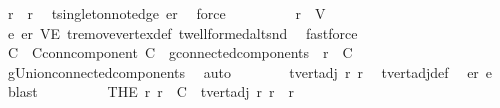 \begin{isabellebody}
\ {\isachardoublequoteopen}r{\isacharprime}{\kern0pt}\ {\isasymnoteq}\ r{\isachardoublequoteclose}\ \isamarkupfalse%
\ t{\isachardot}{\kern0pt}singleton{\isacharunderscore}{\kern0pt}not{\isacharunderscore}{\kern0pt}edge\ {\isacartoucheopen}e{\isasymin}{\isacharquery}{\kern0pt}r{\isacartoucheclose}\ \isamarkupfalse%
\ force\isanewline
\ \ \ \ \ \ \isamarkupfalse%
\ \isamarkupfalse%
\ {\isachardoublequoteopen}r{\isacharprime}{\kern0pt}\ {\isasymin}\ V{\isacharprime}{\kern0pt}{\isachardoublequoteclose}\ \isamarkupfalse%
\ e\ {\isacartoucheopen}e{\isasymin}{\isacharquery}{\kern0pt}r{\isacartoucheclose}\ VE{\isacharprime}{\kern0pt}\ t{\isachardot}{\kern0pt}remove{\isacharunderscore}{\kern0pt}vertex{\isacharunderscore}{\kern0pt}def\ t{\isachardot}{\kern0pt}wellformed{\isacharunderscore}{\kern0pt}alt{\isacharunderscore}{\kern0pt}snd\ \isamarkupfalse%
\ fastforce\isanewline
\ \ \ \ \ \ \isamarkupfalse%
\ \isamarkupfalse%
\ C\ \ C{\isacharunderscore}{\kern0pt}conn{\isacharunderscore}{\kern0pt}component{\isacharcolon}{\kern0pt}\ {\isachardoublequoteopen}C\ {\isasymin}\ g{\isacharprime}{\kern0pt}{\isachardot}{\kern0pt}connected{\isacharunderscore}{\kern0pt}components{\isachardoublequoteclose}\ \ {\isachardoublequoteopen}r{\isacharprime}{\kern0pt}\ {\isasymin}\ C{\isachardoublequoteclose}\ \isamarkupfalse%
\ g{\isacharprime}{\kern0pt}{\isachardot}{\kern0pt}Union{\isacharunderscore}{\kern0pt}connected{\isacharunderscore}{\kern0pt}components\ \isamarkupfalse%
\ auto\isanewline
\ \ \ \ \ \ \isamarkupfalse%
\ {\isachardoublequoteopen}t{\isachardot}{\kern0pt}vert{\isacharunderscore}{\kern0pt}adj\ r\ r{\isacharprime}{\kern0pt}{\isachardoublequoteclose}\ \isamarkupfalse%
\ t{\isachardot}{\kern0pt}vert{\isacharunderscore}{\kern0pt}adj{\isacharunderscore}{\kern0pt}def\ \isamarkupfalse%
\ {\isacartoucheopen}e{\isasymin}{\isacharquery}{\kern0pt}r{\isacartoucheclose}\ e\ \isamarkupfalse%
\ blast\isanewline
\ \ \ \ \ \ \isamarkupfalse%
\ \isamarkupfalse%
\ {\isachardoublequoteopen}{\isacharparenleft}{\kern0pt}THE\ r{\isacharprime}{\kern0pt}{\isachardot}{\kern0pt}\ r{\isacharprime}{\kern0pt}\ {\isasymin}\ C\ {\isasymand}\ t{\isachardot}{\kern0pt}vert{\isacharunderscore}{\kern0pt}adj\ r\ r{\isacharprime}{\kern0pt}{\isacharparenright}{\kern0pt}\ {\isacharequal}{\kern0pt}\ r{\isacharprime}{\kern0pt}{\isachardoublequoteclose}\ \isamarkupfalse%

\end{isabellebody}
